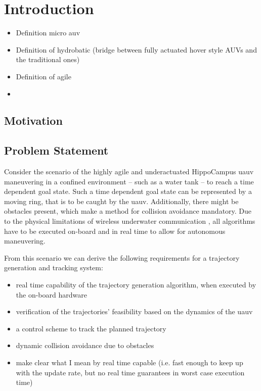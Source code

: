 \chapter{Introduction}
\begin{itemize}
    \color{red}
    \item Definition micro auv \cite{micro-auv}
    \item Definition of hydrobatic \cite{hydrobatic} (bridge between fully actuated hover style AUVs and the traditional ones)
    \item Definition of agile \cite{duecker-phd}
    \item 
\end{itemize}
\section{Motivation}
\section{Problem Statement}
Consider the scenario of the highly agile and underactuated HippoCampus \ac{uauv} maneuvering in a confined environment -- such as a water tank -- to reach a time dependent goal state.
Such a time dependent goal state can be represented by a moving ring, that is to be caught by the \ac{uauv}.
Additionally, there might be obstacles present, which make a method for collision avoidance mandatory.
Due to the physical limitations of wireless underwater communication \cite{Bettale08p1,GeistEtAl16}, all algorithms have to be executed on-board and in real time to allow for autonomous maneuvering.

From this scenario we can derive the following requirements for a trajectory generation and tracking system:

\begin{itemize}
    \item real time capability of the trajectory generation algorithm, when executed by the on-board hardware
    \item verification of the trajectories' feasibility based on the dynamics of the \ac{uauv}
    \item a control scheme to track the planned trajectory
    \item dynamic collision avoidance due to obstacles
    \item make clear what I mean by real time capable (i.e. fast enough to keep up with the update rate, but no real time guarantees in worst case execution time)
\end{itemize}

